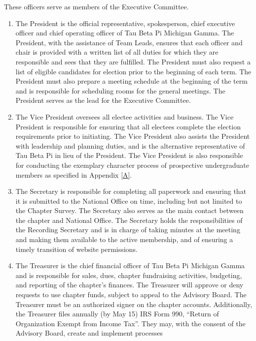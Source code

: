 These officers serve as members of the Executive
Committee.
\begin{enumerate}
    \item {}
    The President is the official representative, spokesperson, chief executive
officer and chief operating officer of Tau Beta Pi Michigan Gamma. The President,
with the assistance of Team Leads, ensures that each officer and chair is provided
with a written list of all duties for which they are responsible and sees that they are
fulfilled. The President must also request a list of eligible candidates for election prior
to the beginning of each term. The President must also prepare a meeting schedule
at the beginning of the term and is responsible for scheduling rooms for the general
meetings. The President serves as the lead for the Executive Committee.
    \item {}
    The Vice President oversees all electee activities and business. The
Vice President is responsible for ensuring that all electees complete the election requirements
prior to initiating. The Vice President also assists the President with leadership
and planning duties, and is the alternative representative of Tau Beta Pi in lieu
of the President. The Vice President is also responsible for conducting the exemplary
character process of prospective undergraduate members as specified in Appendix \ref{A}.
    \item {}
    The Secretary is responsible for completing all paperwork and ensuring
that it is submitted to the National Office on time, including but not limited to the
Chapter Survey. The Secretary also serves as the main contact between the chapter
and National Office. The Secretary holds the responsibilities of the Recording Secretary
and is in charge of taking minutes at the meeting and making them available to
the active membership, and of ensuring a timely transition of website permissions.
    \item {}
    The Treasurer is the chief financial officer of Tau Beta Pi Michigan Gamma
and is responsible for sales, dues, chapter fundraising activities, budgeting, and reporting
of the chapter’s finances. The Treasurer will approve or deny requests to use
chapter funds, subject to appeal to the Advisory Board. The Treasurer must be an
authorized signer on the chapter accounts. Additionally, the Treasurer files annually
(by May 15) IRS Form 990, “Return of Organization Exempt from Income Tax”.
They may, with the consent of the Advisory Board, create and implement processes

\end{enumerate}
